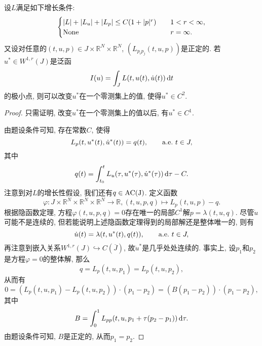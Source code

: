 \begin{theorem}\label{th2.42}
    设$L$满足如下增长条件:
    \begin{equation*}
        \begin{cases}
            |L| + |L_u| + |L_p| \leq C(1 + |p|^r) \quad &1 < r < \infty, \\ 
            {\rm None} \quad &r = \infty.
        \end{cases}
    \end{equation*}
    又设对任意的$(t, u, p) \in J \times \mathbb{R}^N \times \mathbb{R}^N$, $(L_{p_ip_j}(t, u, p))$是正定的.
    若$u^* \in W^{1, r}(J)$是泛函 
    \begin{equation*}
        I(u) = \int_JL(t, u(t), \dot u(t)) \,{\rm d}t
    \end{equation*}
    的极小点, 则可以改变$u^*$在一个零测集上的值, 使得$u^* \in C^2$.
    \begin{proof}
        只需证明, 改变$u^*$在一个零测集上的值以后, 有$u^* \in C^1$.

        由题设条件可知, 存在常数$C$, 使得 
        \begin{equation*}
            L_p(t, u^*(t), \dot u^*(t)) = q(t), \qquad {\rm a.e.}\ t \in J,
        \end{equation*}
        其中 
        \begin{equation*}
            q(t) = \int_{t_0}^tL_u(\tau, u^*(\tau), \dot u^*(\tau)) \,{\rm d}\tau - C.
        \end{equation*}
        注意到对$L$的增长性假设, 我们还有$q \in {\rm AC(J)}$.
        定义函数 
        \begin{equation*}
            \varphi\colon J \times \mathbb{R}^N \times \mathbb{R}^N \times \mathbb{R}^N \rightarrow \mathbb{R}, (t, u, p, q) \mapsto L_p(t, u, p) - q.
        \end{equation*}
        根据隐函数定理, 方程$\varphi(t, u, p, q) = 0$存在唯一的局部$C^1$解$p = \lambda(t, u, q)$.
        尽管$\dot u$可能不是连续的, 但若能说明上述隐函数定理得到的局部解还是整体唯一的, 则有 
        \begin{equation*}
            \dot u(t) = \lambda(t, u^*(t), q(t)), \qquad {\rm a.e.}\ t \in J,
        \end{equation*}
        再注意到嵌入关系$W^{1, r}(J) \hookrightarrow C(\overline{J})$, 故$\dot u^*$是几乎处处连续的. 事实上, 设$p_1$和$p_2$是方程$\varphi = 0$的整体解, 那么 
        \begin{equation*}
            q = L_p(t, u, p_1) = L_p(t, u, p_2),
        \end{equation*}
        从而有 
        \begin{equation*}
            0 = (L_p(t, u, p_1) - L_p(t, u, p_2)) \cdot (p_1 - p_2) = (B(p_1 - p_2)) \cdot (p_1 - p_2),
        \end{equation*}
        其中 
        \begin{equation*}
            B = \int_0^1L_{pp}(t, u, p_1 + \tau(p_2 - p_1)) \,{\rm d}\tau.
        \end{equation*}
        由题设条件可知, $B$是正定的, 从而$p_1 = p_2$.
    \end{proof}
\end{theorem}

